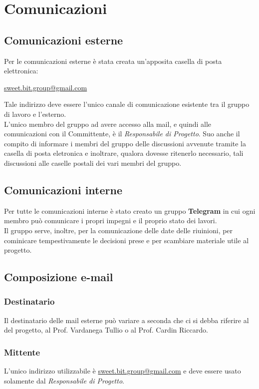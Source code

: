 \section{Comunicazioni}
  \subsection{Comunicazioni esterne}
    Per le comunicazioni esterne è stata creata un'apposita casella di posta elettronica:\\
      \begin{center}
        \href{mailto:sweet.bit.group@gmail.com}{sweet.bit.group@gmail.com}
      \end{center}
    Tale indirizzo deve essere l’unico canale di comunicazione esistente tra il gruppo di lavoro e l’esterno.\\
    L'unico membro del gruppo ad avere accesso alla mail, e quindi alle comunicazioni con il Committente, è il \emph{Responsabile di Progetto}.
    Suo anche il compito di informare i membri del gruppo delle discussioni avvenute tramite la casella di posta eletronica e inoltrare, qualora dovesse ritenerlo necessario,
    tali discussioni alle caselle postali dei vari membri del gruppo.
  \subsection{Comunicazioni interne}
    Per tutte le comunicazioni interne è stato creato un gruppo \textbf{Telegram} in cui ogni membro può comunicare i propri impegni e il proprio stato dei lavori.\\
    Il gruppo serve, inoltre, per la comunicazione delle date delle riuinioni, per cominicare tempestivamente le decisioni prese e per scambiare materiale utile al progetto.
  \subsection{Composizione e-mail}
    \subsubsection{Destinatario}
      Il destinatario delle mail esterne può variare a seconda che ci si debba riferire al  del progetto, al Prof. Vardanega Tullio o al Prof. Cardin Riccardo.
    \subsubsection{Mittente}
      L’unico indirizzo utilizzabile è \href{mailto:sweet.bit.group@gmail.com}{sweet.bit.group@gmail.com} e deve essere usato solamente dal \emph{Responsabile di Progetto}.
